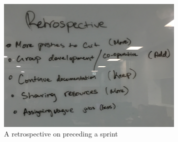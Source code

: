 \begin{figure}[!h]
\begin{center}
\includegraphics[width=9cm]{figures/retro}
\end{center}
\caption{A retrospective on preceding a sprint}
\label{fig:agilemethod}
\end{figure}
